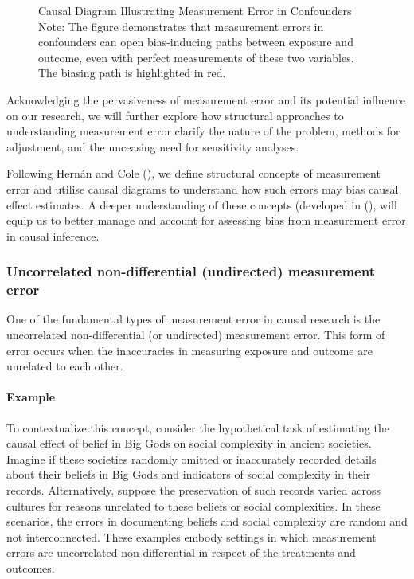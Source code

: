 \documentclass[
  singlecolumn,
  9pt]{article}
\let\oldparagraph\paragraph
\renewcommand{\paragraph}[1]{\oldparagraph{#1}\mbox{}}
\begin{document}
\begin{figure}


\caption{\label{fig-1}Causal Diagram Illustrating Measurement Error in
Confounders Note: The figure demonstrates that measurement errors in
confounders can open bias-inducing paths between exposure and outcome,
even with perfect measurements of these two variables. The biasing path
is highlighted in red.}

\end{figure}%

Acknowledging the pervasiveness of measurement error and its potential
influence on our research, we will further explore how structural
approaches to understanding measurement error clarify the nature of the
problem, methods for adjustment, and the unceasing need for sensitivity
analyses.

Following Hernán and Cole (), we
define structural concepts of measurement error and utilise causal
diagrams to understand how such errors may bias causal effect estimates.
A deeper understanding of these concepts (developed in
(), will
equip us to better manage and account for assessing bias from
measurement error in causal inference.

\subsubsection{Uncorrelated non-differential (undirected) measurement
error}\label{uncorrelated-non-differential-undirected-measurement-error}

One of the fundamental types of measurement error in causal research is
the uncorrelated non-differential (or undirected) measurement error.
This form of error occurs when the inaccuracies in measuring exposure
and outcome are unrelated to each other.

\paragraph{Example}\label{example}

To contextualize this concept, consider the hypothetical task of
estimating the causal effect of belief in Big Gods on social complexity
in ancient societies. Imagine if these societies randomly omitted or
inaccurately recorded details about their beliefs in Big Gods and
indicators of social complexity in their records. Alternatively, suppose
the preservation of such records varied across cultures for reasons
unrelated to these beliefs or social complexities. In these scenarios,
the errors in documenting beliefs and social complexity are random and
not interconnected. These examples embody settings in which measurement
errors are uncorrelated non-differential in respect of the treatments
and outcomes.
\end{document}
